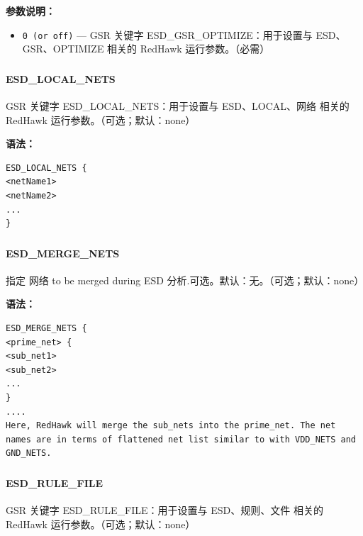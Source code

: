 \textbf{参数说明：}
\begin{itemize}
\item \texttt{0 (or off)} — GSR 关键字 ESD\_GSR\_OPTIMIZE：用于设置与 ESD、GSR、OPTIMIZE 相关的 RedHawk 运行参数。（必需）
\end{itemize}

\subsubsection{}
\paragraph*{ESD_LOCAL_NETS}

GSR 关键字 ESD_LOCAL_NETS：用于设置与 ESD、LOCAL、网络 相关的 RedHawk 运行参数。（可选；默认：none）

\textbf{语法：}
\begin{lstlisting}
ESD_LOCAL_NETS {
<netName1>
<netName2>
...
}
\end{lstlisting}

\subsubsection{}
\paragraph*{ESD_MERGE_NETS}

指定 网络 to be merged during ESD 分析.可选。默认：无。（可选；默认：none）

\textbf{语法：}
\begin{lstlisting}
ESD_MERGE_NETS {
<prime_net> {
<sub_net1>
<sub_net2>
...
}
....
Here, RedHawk will merge the sub_nets into the prime_net. The net
names are in terms of flattened net list similar to with VDD_NETS and
GND_NETS.
\end{lstlisting}

\subsubsection{}
\paragraph*{ESD_RULE_FILE}

GSR 关键字 ESD_RULE_FILE：用于设置与 ESD、规则、文件 相关的 RedHawk 运行参数。（可选；默认：none）

